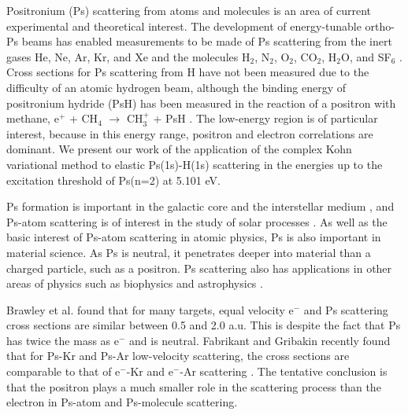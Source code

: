 \documentclass[preprint,showpacs,showkeys,preprintnumbers,amsmath,amssymb,longbibliography,pra,aps]{revtex4-1}
\begin{document}
Positronium (Ps) scattering from atoms and molecules is an area of current 
experimental and theoretical interest. The development of energy-tunable
ortho-Ps beams
\cite{Brown1985,Laricchia1987,Zafar1996,Garner1996,Laricchia2008} 
has enabled measurements to be made of Ps scattering from the inert gases He,
Ne, Ar, Kr, and Xe
\cite{Garner1996,Garner2000,Armitage2002,Laricchia2004,Armitage2006,Laricchia2008,Engbrecht2008,Brawley2010a}
and the molecules H$_2$, N$_2$, O$_2$, CO$_2$, H$_2$O, and SF$_6$
\cite{Garner1996,Garner1998,Garner2000,Laricchia2004,Armitage2006,Beale2006,Brawley2010a}.
Cross sections for Ps scattering from H have not been measured due to the
difficulty of an atomic hydrogen beam, although the binding energy of positronium
hydride (PsH) has been measured in the reaction of a positron with methane,
e$^+$ + CH$_4$ $\to$ CH$_3^+$ + PsH \cite{Schrader1992}. The low-energy region
is of particular interest, because in this energy range, positron and electron 
correlations are dominant. We present
\cite{Conferences1,Conferences2,Conferences3,WoodsDiss2015} 
our work of the application of the complex Kohn variational 
method to elastic Ps(1s)-H(1s) scattering in the energies up to the 
excitation threshold of Ps(n=2) at 5.101 eV.

Ps formation is important in the galactic core \cite{Kinzer1996} and the 
interstellar medium \cite{Guessoum2005}, and Ps-atom 
scattering is of interest in the study of solar processes \cite{Crannell1976}.
As well as the basic interest of Ps-atom scattering in atomic physics, Ps 
is also important in material science. As Ps is neutral, it penetrates deeper 
into material than a charged particle, such as a positron. Ps scattering also 
has applications in other areas of physics such as biophysics and 
astrophysics \cite{Laricchia2012}.

Brawley et al. \cite{Brawley2010a,Brawley2010} found that for many targets,
equal velocity e$^-$ and Ps scattering cross sections are similar between 0.5
and 2.0 a.u. This is despite the fact that Ps has twice
the mass as e$^-$ and is neutral. Fabrikant and Gribakin recently found that
for Ps-Kr and Ps-Ar low-velocity scattering, the cross sections are comparable
to that of e$^-$-Kr and e$^-$-Ar scattering
\cite{Fabrikant2014,Fabrikant2014a}. The tentative conclusion is that the
positron plays a much smaller role in the scattering process than the electron
in Ps-atom and Ps-molecule scattering.
\end{document}
